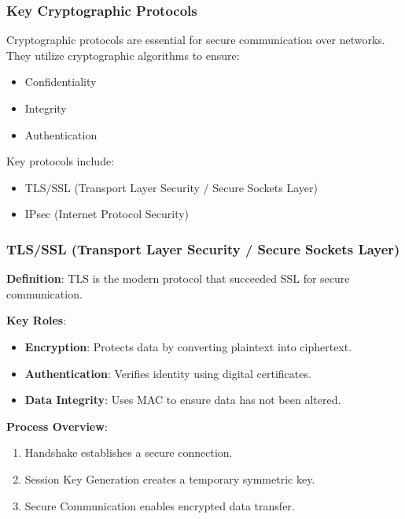 \documentclass{beamer}
\begin{document}
\begin{frame}[fragile]
    \frametitle{Key Cryptographic Protocols}
    Cryptographic protocols are essential for secure communication over networks. 
    They utilize cryptographic algorithms to ensure:
    \begin{itemize}
        \item Confidentiality
        \item Integrity
        \item Authentication
    \end{itemize}
    Key protocols include:
    \begin{itemize}
        \item TLS/SSL (Transport Layer Security / Secure Sockets Layer)
        \item IPsec (Internet Protocol Security)
    \end{itemize}
\end{frame}

\begin{frame}[fragile]
    \frametitle{TLS/SSL (Transport Layer Security / Secure Sockets Layer)}
    \textbf{Definition}: 
    TLS is the modern protocol that succeeded SSL for secure communication.

    \textbf{Key Roles}:
    \begin{itemize}
        \item \textbf{Encryption}: Protects data by converting plaintext into ciphertext.
        \item \textbf{Authentication}: Verifies identity using digital certificates.
        \item \textbf{Data Integrity}: Uses MAC to ensure data has not been altered.
    \end{itemize}

    \textbf{Process Overview}:
    \begin{enumerate}
        \item Handshake establishes a secure connection.
        \item Session Key Generation creates a temporary symmetric key.
        \item Secure Communication enables encrypted data transfer.
    \end{enumerate}
\end{frame}
\end{document}
